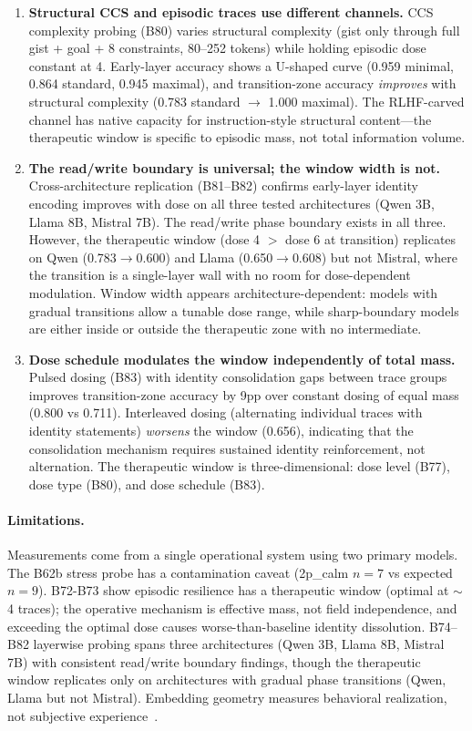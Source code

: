 \documentclass[11pt,a4paper]{article}
\begin{document}
\begin{enumerate}
\item \textbf{Structural CCS and episodic traces use different channels.}
CCS complexity probing (B80) varies structural complexity (gist only through
full gist + goal + 8 constraints, 80--252 tokens) while holding episodic dose
constant at 4. Early-layer accuracy shows a U-shaped curve (0.959 minimal,
0.864 standard, 0.945 maximal), and transition-zone accuracy \emph{improves}
with structural complexity (0.783 standard $\to$ 1.000 maximal). The RLHF-carved
channel has native capacity for instruction-style structural content---the
therapeutic window is specific to episodic mass, not total information volume.

\item \textbf{The read/write boundary is universal; the window width is not.}
Cross-architecture replication (B81--B82) confirms early-layer identity
encoding improves with dose on all three tested architectures (Qwen 3B,
Llama 8B, Mistral 7B). The read/write phase boundary exists in all three.
However, the therapeutic window (dose 4 $>$ dose 6 at transition) replicates
on Qwen (0.783$\to$0.600) and Llama (0.650$\to$0.608) but not Mistral,
where the transition is a single-layer wall with no room for dose-dependent
modulation. Window width appears architecture-dependent: models with gradual
transitions allow a tunable dose range, while sharp-boundary models are
either inside or outside the therapeutic zone with no intermediate.

\item \textbf{Dose schedule modulates the window independently of total mass.}
Pulsed dosing (B83) with identity consolidation gaps between trace groups
improves transition-zone accuracy by 9pp over constant dosing of equal mass
(0.800 vs 0.711). Interleaved dosing (alternating individual traces with
identity statements) \emph{worsens} the window (0.656), indicating that the
consolidation mechanism requires sustained identity reinforcement, not
alternation. The therapeutic window is three-dimensional: dose level (B77),
dose type (B80), and dose schedule (B83).
\end{enumerate}

\paragraph{Limitations.} Measurements come from a single operational system using
two primary models. The B62b stress probe has a contamination caveat (2p\_calm
$n=7$ vs expected $n=9$). B72-B73 show episodic resilience has a therapeutic window (optimal at $\sim$4 traces);
the operative mechanism is effective mass, not field independence, and exceeding the
optimal dose causes worse-than-baseline identity dissolution. B74--B82 layerwise probing spans three architectures (Qwen 3B,
Llama 8B, Mistral 7B) with consistent read/write boundary findings,
though the therapeutic window replicates only on architectures with
gradual phase transitions (Qwen, Llama but not Mistral).
Embedding geometry measures behavioral realization, not
subjective experience~\cite{chalmers2026}.
\end{document}

